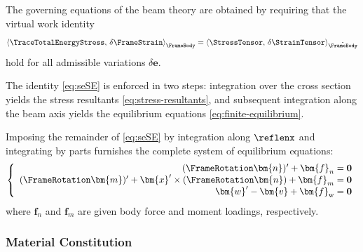 The governing equations of the beam theory are obtained by requiring that the virtual work identity
\begin{equation}
\left<\TraceTotalEnergyStress,\,\delta\FrameStrain\right>_{\FrameBody}=\left<\StressTensor ,\,\delta\StrainTensor\right>_{\hat{\FrameBody}}
\label{eq:seSE}
\end{equation}
hold for all admissible variations \(\delta\bm{e}\). 

The identity \eqref{eq:seSE} is enforced in two steps: integration over the cross section yields the stress resultants \eqref{eq:stress-resultants}, and subsequent integration along the beam axis yields the equilibrium equations \eqref{eq:finite-equilibrium}.






Imposing the remainder of \eqref{eq:seSE} by integration along \(\reflenx\) and integrating by parts furnishes the complete system of equilibrium equations:
\begin{equation} 
\left\{\begin{array}{r}
(\FrameRotation \bm{n})^{\prime}+{\bm{f}}_n=\mathbf{0} \\
(\FrameRotation \bm{m})^{\prime}+\bm{x}^{\prime} \times (\FrameRotation \bm{n}) +{\bm{f}}_m=\mathbf{0} \\
\bm{w}^{\prime}-\bm{v} + \bm{f}_{\rm w} = \mathbf{0}
\end{array}\right. 
\label{eq:finite-equilibrium}
\end{equation}
where \(\bm{f}_n\) and \(\bm{f}_m\) are given body force and moment loadings, respectively. 


\subsubsection{Material Constitution}\label{sec:std-material}

